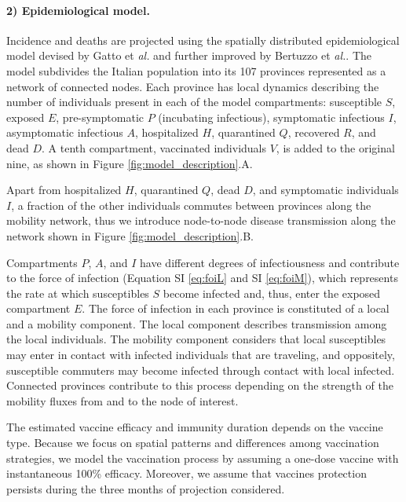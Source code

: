 \paragraph{2) Epidemiological model.} Incidence and deaths are projected using the spatially distributed epidemiological model devised by Gatto et \textit{al.}\cite{Gatto:SpreadDynamicsCOVID19:2020} and further improved by Bertuzzo et \textit{al.}\cite{Bertuzzo:GeographyCOVID19Spread:2020}. The model subdivides the Italian population into its 107 provinces represented as a network of connected nodes. Each province has local dynamics describing the number of individuals present in each of the model compartments: susceptible $S$, exposed $E$, pre-symptomatic $P$ (incubating infectious), symptomatic infectious $I$, asymptomatic infectious $A$, hospitalized $H$, quarantined $Q$, recovered $R$, and dead $D$. A tenth compartment, vaccinated individuals $V$, is added to the original nine, as shown in Figure \ref{fig:model_description}.A.

Apart from hospitalized $H$, quarantined $Q$, dead $D$, and symptomatic individuals $I$, a fraction of the other individuals commutes between provinces along the mobility network, thus we introduce node-to-node disease transmission along the network shown in Figure \ref{fig:model_description}.B.

Compartments $P$, $A$, and $I$ have different degrees of infectiousness and contribute to the force of infection (Equation SI \eqref{eq:foiL} and SI \eqref{eq:foiM}), which represents the rate at which susceptibles $S$ become infected and, thus, enter the exposed compartment $E$. The force of infection in each province is constituted of a local and a mobility component. The local component describes transmission among the local individuals. The mobility component considers that local susceptibles may enter in contact with infected individuals that are traveling, and oppositely, susceptible commuters may become infected through contact with local infected. Connected provinces contribute to this process depending on the strength of the mobility fluxes from and to the node of interest.

The estimated vaccine efficacy and immunity duration depends on the vaccine type. Because we focus on spatial patterns and differences among vaccination strategies, we model the vaccination process by assuming a one-dose vaccine with instantaneous 100\% efficacy. %
Moreover, we assume that vaccines protection persists during the three months of projection considered.

